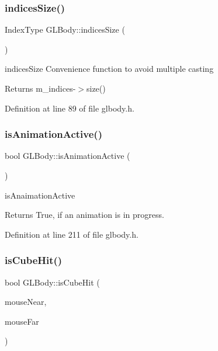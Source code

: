 \subsubsection{\texorpdfstring{indicesSize()}{indicesSize()}}
{\footnotesize\ttfamily Index\+Type G\+L\+Body\+::indices\+Size (\begin{DoxyParamCaption}{ }\end{DoxyParamCaption})\hspace{0.3cm}{\ttfamily [inline]}}



indices\+Size Convenience function to avoid multiple casting 

\begin{DoxyReturn}{Returns}
m\+\_\+indices-\/$>$size() 
\end{DoxyReturn}


Definition at line 89 of file glbody.\+h.

\mbox{\label{class_g_l_body_a78e66df2ed6e8277d3363054b0ad0f2e}} 
\subsubsection{\texorpdfstring{isAnimationActive()}{isAnimationActive()}}
{\footnotesize\ttfamily bool G\+L\+Body\+::is\+Animation\+Active (\begin{DoxyParamCaption}{ }\end{DoxyParamCaption})\hspace{0.3cm}{\ttfamily [inline]}}



is\+Anaimation\+Active 

\begin{DoxyReturn}{Returns}
True, if an animation is in progress. 
\end{DoxyReturn}


Definition at line 211 of file glbody.\+h.

\mbox{\label{class_g_l_body_a565ad6592f00bd28942408a1a8ecd669}} 
\subsubsection{\texorpdfstring{isCubeHit()}{isCubeHit()}}
{\footnotesize\ttfamily bool G\+L\+Body\+::is\+Cube\+Hit (\begin{DoxyParamCaption}\item[{Q\+Vector3D}]{mouse\+Near,  }\item[{Q\+Vector3D}]{mouse\+Far }\end{DoxyParamCaption})\hspace{0.3cm}{\ttfamily [virtual]}}



